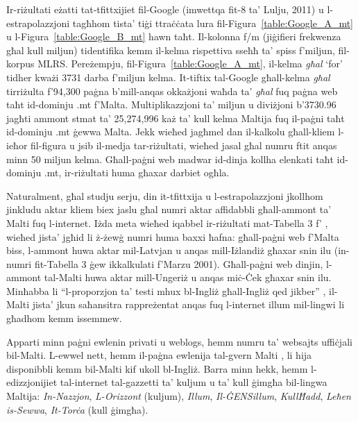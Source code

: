 \begin{multicols}{2}
Ir-riżultati eżatti tat-tfittxijiet fil-Google (imwettqa fit-8 ta’ Lulju, 2011) u l-estrapolazzjoni tagħhom tista’ tiġi ttraċċata lura fil-Figura~\ref{table:Google_A_mt} u l-Figura~\ref{table:Google_B_mt} hawn taħt. Il-kolonna f/m (jiġifieri frekwenza għal kull miljun) tidentifika kemm il-kelma rispettiva sseħħ ta’ spiss f’miljun, fil-korpus MLRS. Pereżempju, fil-Figura~\ref{table:Google_A_mt}, il-kelma \emph{għal} ‘for’ tidher kważi 3731 darba f’miljun kelma. It-tiftix tal-Google għall-kelma \emph{għal} tirriżulta f’94,300 paġna b’mill-anqas okkażjoni waħda ta’ \emph{għal} fuq paġna web taħt id-dominju .mt f'Malta. Multiplikazzjoni ta’ miljun u diviżjoni b’3730.96 jagħti ammont stmat ta’ 25,274,996 każ ta’ kull kelma Maltija fuq il-paġni taħt id-dominju .mt ġewwa Malta. Jekk wieħed jagħmel dan il-kalkolu għall-kliem l-ieħor fil-figura u jsib il-medja tar-riżultati, wieħed jasal għal numru ftit anqas minn 50 miljun kelma. Għall-paġni web madwar id-dinja kollha elenkati taħt id-dominju .mt, ir-riżultati huma għaxar darbiet ogħla.

Naturalment, għal studju serju, din it-tfittxija u l-estrapolazzjoni jkollhom jinkludu aktar kliem biex jaslu għal numri aktar affidabbli għall-ammont ta’ Malti fuq l-internet. Iżda meta wieħed iqabbel ir-riżultati mat-Tabella 3 f’ \cite{Kilgarriff-Grefenstette:2003}, wieħed jista’ jgħid li ż-żewġ numri huma baxxi ħafna: għall-paġni web f’Malta biss, l-ammont huwa aktar mil-Latvjan u anqas mill-Iżlandiż għaxar snin ilu (in-numri fit-Tabella 3 ġew ikkalkulati f’Marzu 2001). Għall-paġni web dinjin, l-ammont tal-Malti huwa aktar mill-Ungeriż u anqas miċ-Ċek għaxar snin ilu. Minħabba li ``l-proporzjon ta’ testi mhux bl-Ingliż għall-Ingliż qed jikber'' \cite{Kilgarriff-Grefenstette:2003}, il-Malti jista’ jkun saħansitra rappreżentat anqas fuq l-internet illum mil-lingwi li għadhom kemm issemmew.

Apparti minn paġni ewlenin privati u weblogs, hemm numru ta’ websajts uffiċjali bil-Malti. L-ewwel nett, hemm il-paġna ewlenija tal-gvern Malti \cite{GovernmentOfMalta1}, li hija disponibbli kemm bil-Malti kif ukoll bl-Ingliż. Barra minn hekk, hemm l-edizzjonijiet tal-internet tal-gazzetti ta’ kuljum u ta’ kull ġimgħa bil-lingwa Maltija: \emph{In-Nazzjon}, \emph{L-Orizzont} (kuljum), \emph{Illum}, \emph{Il-ĠENSillum}, \emph{KullĦadd}, \emph{Leħen is-Sewwa}, \emph{It-Torċa} (kull ġimgħa).


\end{multicols}
